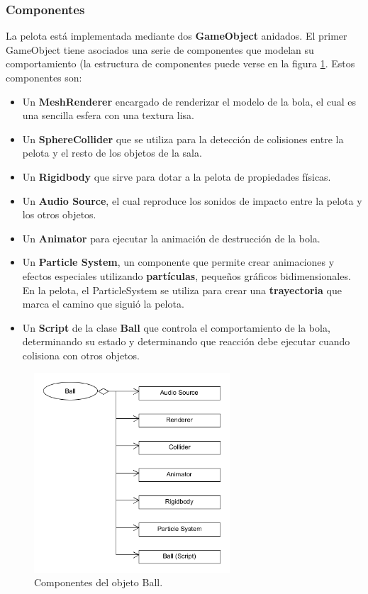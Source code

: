 \subsubsection{Componentes}
La pelota está implementada mediante dos \textbf{GameObject} anidados. El primer GameObject tiene asociados una serie de componentes que modelan su comportamiento (la estructura de componentes puede verse en la figura \ref{ball_object}. Estos componentes son:
\begin{itemize}
\item Un \textbf{MeshRenderer} encargado de renderizar el modelo de la bola, el cual es una sencilla esfera con una textura lisa.
\item Un \textbf{SphereCollider} que se utiliza para la detección de colisiones entre la pelota y el resto de los objetos de la sala.
\item Un \textbf{Rigidbody} que sirve para dotar a la pelota de propiedades físicas.
\item Un \textbf{Audio Source}, el cual reproduce los sonidos de impacto entre la pelota y los otros objetos.
\item Un \textbf{Animator} para ejecutar la animación de destrucción de la bola.
\item Un \textbf{Particle System}, un componente que permite crear animaciones y efectos especiales utilizando \textbf{partículas}, pequeños gráficos bidimensionales. En la pelota, el ParticleSystem se utiliza para crear una \textbf{trayectoria} que marca el camino que siguió la pelota.
\item Un \textbf{Script} de la clase \textbf{Ball} que controla el comportamiento de la bola, determinando su estado y determinando que reacción debe ejecutar cuando colisiona con otros objetos.
\end{itemize}

\begin{figure}[h]
	\includegraphics[width=0.65\textwidth]{images/estructura/fisica/ball}
	\centering
	\caption{Componentes del objeto Ball.}
	\label{ball_object}
\end{figure}

